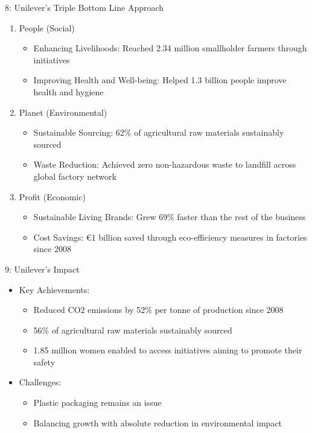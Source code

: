 \documentclass[
  ignorenonframetext,
]{beamer}
\providecommand{\tightlist}{%
  \setlength{\itemsep}{0pt}\setlength{\parskip}{0pt}}\usepackage{longtable,booktabs,array}
\begin{document}
\begin{frame}{8: Unilever's Triple Bottom Line Approach}
\label{unilevers-triple-bottom-line-approach}
\begin{enumerate}
\tightlist
\item
  People (Social)

  \begin{itemize}
  \tightlist
  \item
    Enhancing Livelihoods: Reached 2.34 million smallholder farmers
    through initiatives
  \item
    Improving Health and Well-being: Helped 1.3 billion people improve
    health and hygiene
  \end{itemize}
\item
  Planet (Environmental)

  \begin{itemize}
  \tightlist
  \item
    Sustainable Sourcing: 62\% of agricultural raw materials sustainably
    sourced
  \item
    Waste Reduction: Achieved zero non-hazardous waste to landfill
    across global factory network
  \end{itemize}
\item
  Profit (Economic)

  \begin{itemize}
  \tightlist
  \item
    Sustainable Living Brands: Grew 69\% faster than the rest of the
    business
  \item
    Cost Savings: €1 billion saved through eco-efficiency measures in
    factories since 2008
  \end{itemize}
\end{enumerate}
\end{frame}

\begin{frame}{9: Unilever's Impact}
\label{unilevers-impact}
\begin{itemize}
\tightlist
\item
  Key Achievements:

  \begin{itemize}
  \tightlist
  \item
    Reduced CO2 emissions by 52\% per tonne of production since 2008
  \item
    56\% of agricultural raw materials sustainably sourced
  \item
    1.85 million women enabled to access initiatives aiming to promote
    their safety
  \end{itemize}
\item
  Challenges:

  \begin{itemize}
  \tightlist
  \item
    Plastic packaging remains an issue
  \item
    Balancing growth with absolute reduction in environmental impact
  \end{itemize}
\end{itemize}
\end{frame}
\end{document}

